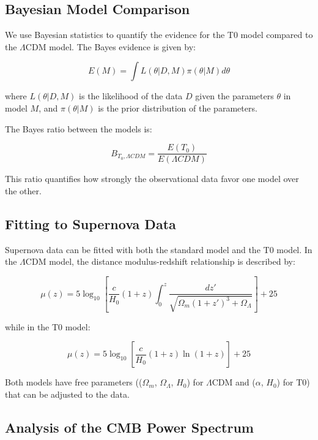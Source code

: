 \documentclass[a4paper,12pt]{article}
\begin{document}
\subsection{Bayesian Model Comparison}

We use Bayesian statistics to quantify the evidence for the T0 model compared to the $\Lambda$CDM model. The Bayes evidence is given by:

\begin{equation}
	E(M) = \int L(\theta|D,M) \pi(\theta|M) d\theta
\end{equation}

where $L(\theta|D,M)$ is the likelihood of the data $D$ given the parameters $\theta$ in model $M$, and $\pi(\theta|M)$ is the prior distribution of the parameters.

The Bayes ratio between the models is:

\begin{equation}
	B_{T_0,\Lambda CDM} = \frac{E(T_0)}{E(\Lambda CDM)}
\end{equation}

This ratio quantifies how strongly the observational data favor one model over the other.

\subsection{Fitting to Supernova Data}

Supernova data can be fitted with both the standard model and the T0 model. In the $\Lambda$CDM model, the distance modulus-redshift relationship is described by:

\begin{equation}
	\mu(z) = 5 \log_{10}\left[\frac{c}{H_0}(1+z)\int_0^z \frac{dz'}{\sqrt{\Omega_m(1+z')^3 + \Omega_{\Lambda}}}\right] + 25
\end{equation}

while in the T0 model:

\begin{equation}
	\mu(z) = 5 \log_{10}\left[\frac{c}{H_0}(1+z)\ln(1+z)\right] + 25
\end{equation}

Both models have free parameters (($\Omega_m$, $\Omega_{\Lambda}$, $H_0$) for $\Lambda$CDM and ($\alpha$, $H_0$) for T0) that can be adjusted to the data.

\subsection{Analysis of the CMB Power Spectrum}
\end{document}
